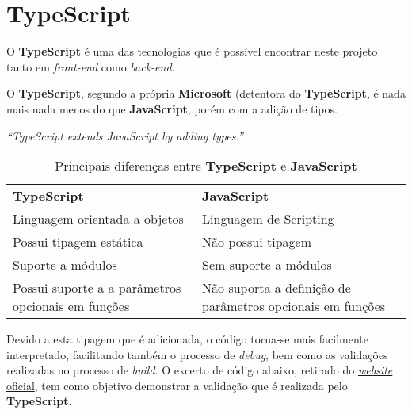 \section{TypeScript}

\begin{minipage}[t]{.3\textwidth}
\end{minipage}
\begin{minipage}[t]{.7\textwidth}
	\minipagerestore

	O \textbf{TypeScript} é uma das tecnologias que é possível encontrar neste projeto tanto em \textit{front-end} como \textit{back-end}.

	O \textbf{TypeScript}, segundo a própria \textbf{Microsoft} (detentora do \textbf{TypeScript}, é nada mais nada menos do que \textbf{JavaScript}, porém com a adição de tipos.

	\epigraph{
		\textit{``TypeScript extends JavaScript by adding types.''}
	}{}
\end{minipage}

{
\renewcommand{\arraystretch}{1.25}
\begin{table}[h]
	\begin{tabularx}{\textwidth}{ |X|X| }
		\rowcolor{estg}	{\color[HTML]{FFFFFF} \textbf{TypeScript}} & {\color[HTML]{FFFFFF} \textbf{JavaScript}} \\
		Linguagem orientada a objetos & Linguagem de Scripting \\\hline
		Possui tipagem estática & Não possui tipagem \\\hline
		Suporte a módulos & Sem suporte a módulos\\\hline
		Possui suporte a a parâmetros opcionais em funções & Não suporta a definição de parâmetros opcionais em funções \\\hline
	\end{tabularx}

	\caption{Principais diferenças entre \textbf{TypeScript} e \textbf{JavaScript}}
\end{table}
}

Devido a esta tipagem que é adicionada, o código torna-se mais facilmente interpretado, facilitando também o processo de \textit{debug}, bem como as validações realizadas no processo de \textit{build}. O excerto de código abaixo, retirado do \href{https://www.typescriptlang.org}{\textit{website} oficial}, tem como objetivo demonstrar a validação que é realizada pelo \textbf{TypeScript}.

